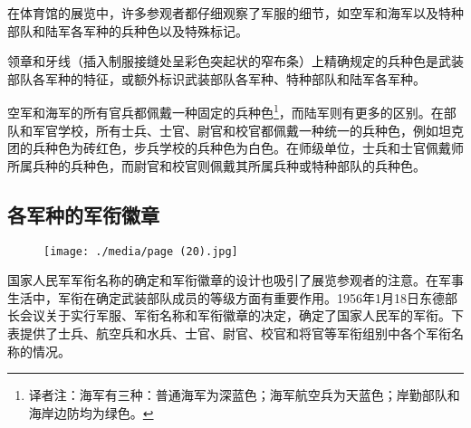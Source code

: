 在体育馆的展览中，许多参观者都仔细观察了军服的细节，如空军和海军以及特种部队和陆军各军种的兵种色以及特殊标记。

领章和牙线（插入制服接缝处呈彩色突起状的窄布条）上精确规定的兵种色是武装部队各军种的特征，或额外标识武装部队各军种、特种部队和陆军各军种。

空军和海军的所有官兵都佩戴一种固定的兵种色\footnote{译者注：海军有三种：普通海军为深蓝色；海军航空兵为天蓝色；岸勤部队和海岸边防均为绿色。\cite{clarionv}}，而陆军则有更多的区别。在部队和军官学校，所有士兵、士官、尉官和校官都佩戴一种统一的兵种色，例如坦克团的兵种色为砖红色，步兵学校的兵种色为白色。在师级单位，士兵和士官佩戴师所属兵种的兵种色，而尉官和校官则佩戴其所属兵种或特种部队的兵种色。

\subsection{各军种的军衔徽章}

\begin{figure}
\texttt{[image: ./media/page (20).jpg]}
\end{figure}

国家人民军军衔名称的确定和军衔徽章的设计也吸引了展览参观者的注意。在军事生活中，军衔在确定武装部队成员的等级方面有重要作用。1956年1月18日东德部长会议关于实行军服、军衔名称和军衔徽章的决定，确定了国家人民军的军衔。下表提供了士兵、航空兵和水兵、士官、尉官、校官和将官等军衔组别中各个军衔名称的情况。

